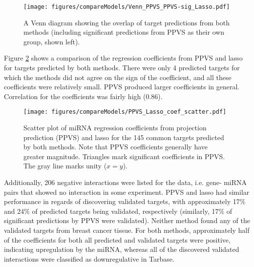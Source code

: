 \begin{figure}
  \centering
  \texttt{[image: figures/compareModels/Venn\_PPVS\_PPVS-sig\_Lasso.pdf]}
  \caption{A Venn diagram showing the overlap of target predictions from both
  methods (including significant predictions from PPVS as their own group,
  shown left).}
  \label{fig:venn}
\end{figure}

Figure \ref{fig:scatter-ppvs-lasso} shows a comparison of the regression
coefficients from PPVS and lasso for targets predicted by both methods. There
were only 4 predicted targets for which the methods did not agree on the sign
of the coefficient, and all these coefficients were relatively small. PPVS
produced larger coefficients in general. Correlation for the coefficients was
fairly high ($0.86$).

\begin{figure}[htb]
  \centering
  \texttt{[image: figures/compareModels/PPVS\_Lasso\_coef\_scatter.pdf]}
  \caption{Scatter plot of miRNA regression coefficients from projection
  prediction (PPVS) and lasso for the 145 common targets predicted by both methods.
  Note that PPVS coefficients generally have greater magnitude. Triangles
  mark significant coefficients in PPVS. The gray
  line marks unity ($x=y$).}
  \label{fig:scatter-ppvs-lasso}
\end{figure}

Additionally, 206 negative interactions were listed for the data, i.e. gene-
miRNA pairs that showed no interaction in some experiment. PPVS and lasso had
similar performance in regards of discovering validated targets, with
approximately 17\% and 24\% of predicted targets being validated, respectively
(similarly, 17\% of significant predictions by PPVS were validated). Neither
method found any of the validated targets from breast cancer tissue. For both
methods, approximately half of the coefficients for both all predicted and
validated targets were positive, indicating upregulation by the miRNA, whereas
all of the discovered validated interactions were classified as downregulative
in Tarbase.
